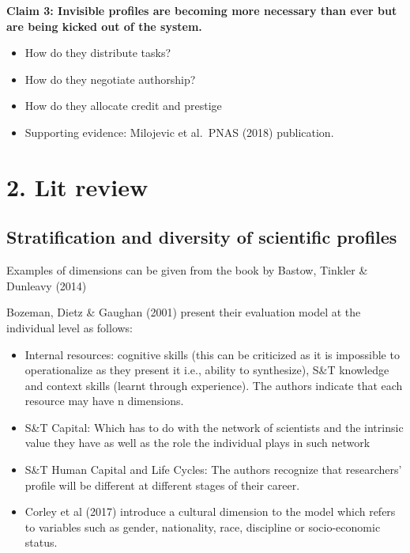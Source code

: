 \documentclass[]{elsarticle} %
\providecommand{\tightlist}{%
  \setlength{\itemsep}{0pt}\setlength{\parskip}{0pt}}
\begin{document}
\textbf{Claim 3: Invisible profiles are becoming more necessary than
ever but are being kicked out of the system.}

\begin{itemize}
\tightlist
\item
  How do they distribute tasks?
\item
  How do they negotiate authorship?
\item
  How do they allocate credit and prestige
\item
  Supporting evidence: Milojevic et al.~PNAS (2018) publication.
\end{itemize}

\hypertarget{lit-review}{%
\section{2. Lit review}\label{lit-review}}

\hypertarget{stratification-and-diversity-of-scientific-profiles}{%
\subsection{Stratification and diversity of scientific
profiles}\label{stratification-and-diversity-of-scientific-profiles}}

Examples of dimensions can be given from the book by Bastow, Tinkler \&
Dunleavy (2014)

Bozeman, Dietz \& Gaughan (2001) present their evaluation model at the
individual level as follows:

\begin{itemize}
\tightlist
\item
  Internal resources: cognitive skills (this can be criticized as it is
  impossible to operationalize as they present it i.e., ability to
  synthesize), S\&T knowledge and context skills (learnt through
  experience). The authors indicate that each resource may have n
  dimensions.
\item
  S\&T Capital: Which has to do with the network of scientists and the
  intrinsic value they have as well as the role the individual plays in
  such network
\item
  S\&T Human Capital and Life Cycles: The authors recognize that
  researchers' profile will be different at different stages of their
  career.
\item
  Corley et al (2017) introduce a cultural dimension to the model which
  refers to variables such as gender, nationality, race, discipline or
  socio-economic status.
\end{itemize}
\end{document}

